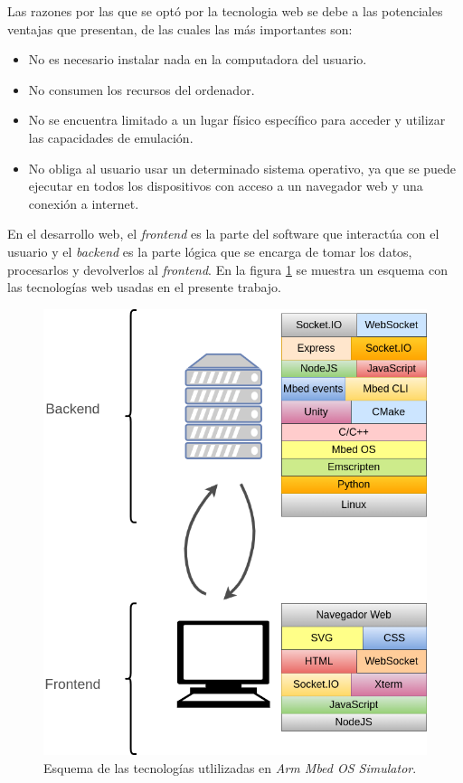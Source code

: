 \hfill \break
\hfill \break
\hfill \break

Las razones por las que se optó por la tecnologia web se debe a las potenciales ventajas que presentan, de las cuales las más importantes son:

\begin{itemize}
	\item No es necesario instalar nada en la computadora del usuario.
	\item No consumen los recursos del ordenador.
	\item No se encuentra limitado a un lugar físico específico para acceder y utilizar las capacidades de emulación.
	\item No obliga al usuario usar un determinado sistema operativo, ya que se puede ejecutar en todos los dispositivos con acceso a un navegador web y una conexión a internet.
\end{itemize}

En el desarrollo web, el \textit{frontend} es la parte del software que interactúa con el usuario y el \textit{backend} es la parte lógica que se encarga de tomar los datos, procesarlos y devolverlos al \textit{frontend}. En la figura \ref{fig:frontBackMbed} se muestra un esquema con las tecnologías web usadas en el presente trabajo.

\hfill \break
\hfill \break
\hfill \break
\hfill \break
\hfill \break
\hfill \break
\hfill \break
\hfill \break
\hfill \break
\hfill \break
\hfill \break
\hfill \break

\begin{figure}[ht]
	\centering
	\includegraphics[scale=.47]{./Figures/FrontendBackendMbed.png}
	\caption{Esquema de las tecnologías utlilizadas en \textit{Arm Mbed OS Simulator}.}
	\label{fig:frontBackMbed}
\end{figure}

